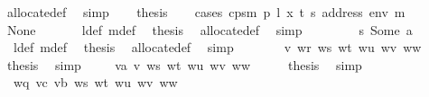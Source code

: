 \begin{isabellebody}
\ allocate{\isacharunderscore}{\kern0pt}def\ \isamarkupfalse%
\ simp\isanewline
\ \ \isamarkupfalse%
\ {\isacharquery}{\kern0pt}thesis\isanewline
\ \ \isamarkupfalse%
\ {\isacharparenleft}{\kern0pt}cases\ {\isachardoublequoteopen}cps{}m\ p\ l\ x{\isacharprime}{\kern0pt}\ t{\isacharprime}{\kern0pt}\ {\isacharparenleft}{\kern0pt}s\ {\isacharparenleft}{\kern0pt}address\ env{\isacharparenright}{\kern0pt}{\isacharparenright}{\kern0pt}\ m{\isacharprime}{\kern0pt}{\isachardoublequoteclose}{\isacharparenright}{\kern0pt}\isanewline
\ \ \ \ \isamarkupfalse%
\ None\isanewline
\ \ \ \ \isamarkupfalse%
\ {}{}\ l{\isacharunderscore}{\kern0pt}def\ m{\isacharprime}{\kern0pt}{\isacharunderscore}{\kern0pt}def\ \isamarkupfalse%
\ {\isacharquery}{\kern0pt}thesis\ \isamarkupfalse%
\ allocate{\isacharunderscore}{\kern0pt}def\ \isamarkupfalse%
\ simp\isanewline
\ \ \isamarkupfalse%
\isanewline
\ \ \ \ \isamarkupfalse%
\ s{}{\isacharcolon}{\kern0pt}\ {\isacharparenleft}{\kern0pt}Some\ a{\isacharparenright}{\kern0pt}\isanewline
\ \ \ \ \isamarkupfalse%
\ {}{}\ l{\isacharunderscore}{\kern0pt}def\ m{\isacharprime}{\kern0pt}{\isacharunderscore}{\kern0pt}def\ \isamarkupfalse%
\ {\isacharquery}{\kern0pt}thesis\ \isamarkupfalse%
\ allocate{\isacharunderscore}{\kern0pt}def\ \isamarkupfalse%
\ simp\isanewline
\ \ \isamarkupfalse%
\isanewline
{}\isamarkupfalse%
\isanewline
\ \ \isamarkupfalse%
\ {\isacharparenleft}{\kern0pt}{}{}\ v\ wr\ ws\ wt\ wu\ wv\ ww{\isacharparenright}{\kern0pt}\isanewline
\ \ \isamarkupfalse%
\ \isamarkupfalse%
\ {\isacharquery}{\kern0pt}thesis\ \isamarkupfalse%
\ simp\isanewline
{}\isamarkupfalse%
\isanewline
\ \ \isamarkupfalse%
\ {\isacharparenleft}{\kern0pt}{}{}\ va\ v\ ws\ wt\ wu\ wv\ ww{\isacharparenright}{\kern0pt}\isanewline
\ \ \isamarkupfalse%
\ \isamarkupfalse%
\ {\isacharquery}{\kern0pt}thesis\ \isamarkupfalse%
\ simp\isanewline
{}\isamarkupfalse%
\isanewline
\ \ \isamarkupfalse%
\ {\isacharparenleft}{\kern0pt}{}{}\ wq\ vc\ vb\ ws\ wt\ wu\ wv\ ww{\isacharparenright}{\kern0pt}\isanewline

\end{isabellebody}
